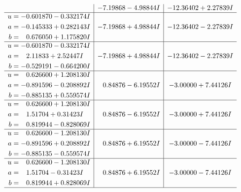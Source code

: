 \documentclass[1p]{elsarticle_modified}
\theoremstyle{definition}
\begin{document}
$$\begin{array}{c|c|c}
 & -7.19868 - 4.98844 I & -12.36402 + 2.27839 I \\ \hline\begin{aligned}
u &= -0.601870 - 0.332174 I \\
a &= -0.145333 + 0.282143 I \\
b &= \phantom{-}0.676050 + 1.175820 I\end{aligned}
 & -7.19868 + 4.98844 I & -12.36402 - 2.27839 I \\ \hline\begin{aligned}
u &= -0.601870 - 0.332174 I \\
a &= \phantom{-}2.11833 + 2.52447 I \\
b &= -0.529191 - 0.664200 I\end{aligned}
 & -7.19868 + 4.98844 I & -12.36402 - 2.27839 I \\ \hline\begin{aligned}
u &= \phantom{-}0.626600 + 1.208130 I \\
a &= -0.891596 - 0.208892 I \\
b &= -0.885135 + 0.559574 I\end{aligned}
 & \phantom{-}0.84876 - 6.19552 I & -3.00000 + 7.44126 I \\ \hline\begin{aligned}
u &= \phantom{-}0.626600 + 1.208130 I \\
a &= \phantom{-}1.51704 + 0.31423 I \\
b &= \phantom{-}0.819944 - 0.828069 I\end{aligned}
 & \phantom{-}0.84876 - 6.19552 I & -3.00000 + 7.44126 I \\ \hline\begin{aligned}
u &= \phantom{-}0.626600 - 1.208130 I \\
a &= -0.891596 + 0.208892 I \\
b &= -0.885135 - 0.559574 I\end{aligned}
 & \phantom{-}0.84876 + 6.19552 I & -3.00000 - 7.44126 I \\ \hline\begin{aligned}
u &= \phantom{-}0.626600 - 1.208130 I \\
a &= \phantom{-}1.51704 - 0.31423 I \\
b &= \phantom{-}0.819944 + 0.828069 I\end{aligned}
 & \phantom{-}0.84876 + 6.19552 I & -3.00000 - 7.44126 I\\
 \hline 
 \end{array}$$\newpage$$\begin{array}{c|c|c}  

\end{array}$$
\end{document}
